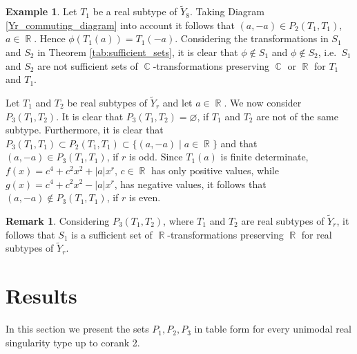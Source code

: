 \documentclass[noend]{amsproc}
\theoremstyle{definition}
\newtheorem{remark}[theorem]{Remark}
\newtheorem{example}[theorem]{Example}
\DeclareMathOperator{\R}{\mathbb{R}}
\DeclareMathOperator{\C}{\mathbb{C}}
\begin{document}
\begin{example}\label{tab:counter_example_Yr}
Let $T_1$ be a real subtype of $\widetilde Y_8$. Taking Diagram \ref{Yr_commuting_diagram} into account it follows that $(a,-a)\in P_2(T_1,T_1)$, $a\in\R$. Hence $\phi(T_1(a))=T_1(-a)$. Considering the transformations in $S_1$ and $S_2$ in Theorem \ref{tab:sufficient_sets}, it is clear that $\phi\not\in S_1$ and $\phi\not\in S_2$, i.e.~$S_1$ and $S_2$ are not sufficient sets of $\C$-transformations preserving $\C$ or $\R$ for $T_1$ and $T_1$.
\end{example}

Let $T_1$ and $T_2$ be real subtypes of $\widetilde Y_r$ and let $a\in\R$. We now consider $P_3(T_1,T_2)$. It is clear that $P_3(T_1,T_2)=\varnothing$, if $T_1$ and $T_2$ are not of the same subtype. Furthermore, it is clear that $P_3(T_1,T_1)\subset P_2(T_1,T_1)\subset\{(a,-a)\mid a\in\R\}$ and that $(a,-a)\in P_3(T_1,T_1)$, if $r$ is odd. Since $T_1(a)$ is finite determinate, $f(x)=c^4+c^2x^2+|a|x^r$, $c\in\R$ has only positive values, while $g(x)=c^4+c^2x^2-|a|x^r$, has negative values, it follows that $(a,-a)\not\in P_3(T_1,T_1)$, if $r$ is even. 

\begin{remark}
Considering $P_3(T_1,T_2)$, where $T_1$ and $T_2$ are real subtypes of $\widetilde Y_r$, it follows that $S_1$ is a sufficient set of $\R$-transformations preserving $\R$ for real subtypes of $\widetilde Y_r$. 
\end{remark}


\section{Results}\label{sec:results}

In this section we present the sets $P_1,P_2,P_3$ in table form for every unimodal real singularity type up to corank 2.
\end{document}
